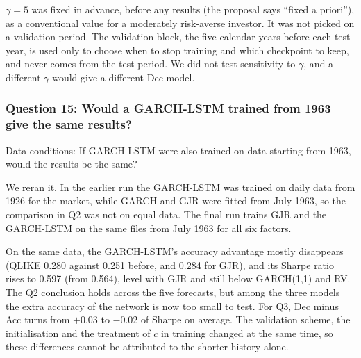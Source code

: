 $\gamma=5$ was fixed in advance, before any results (the proposal says ``fixed a priori''), as a conventional value for a moderately risk-averse investor. It was not picked on a validation period. The validation block, the five calendar years before each test year, is used only to choose when to stop training and which checkpoint to keep, and never comes from the test period. We did not test sensitivity to $\gamma$, and a different $\gamma$ would give a different Dec model.

\subsubsection*{Question 15: Would a GARCH-LSTM trained from 1963 give the same results?}
\begin{question}
Data conditions: If GARCH-LSTM were also trained on data starting from 1963, would the results be the same?
\end{question}
We reran it. In the earlier run the GARCH-LSTM was trained on daily data from 1926 for the market, while GARCH and GJR were fitted from July 1963, so the comparison in Q2 was not on equal data. The final run trains GJR and the GARCH-LSTM on the same files from July 1963 for all six factors.

On the same data, the GARCH-LSTM's accuracy advantage mostly disappears (QLIKE 0.280 against 0.251 before, and 0.284 for GJR), and its Sharpe ratio rises to 0.597 (from 0.564), level with GJR and still below GARCH(1,1) and RV. The Q2 conclusion holds across the five forecasts, but among the three models the extra accuracy of the network is now too small to test. For Q3, Dec minus Acc turns from $+$0.03 to $-$0.02 of Sharpe on average. The validation scheme, the initialisation and the treatment of $c$ in training changed at the same time, so these differences cannot be attributed to the shorter history alone.
